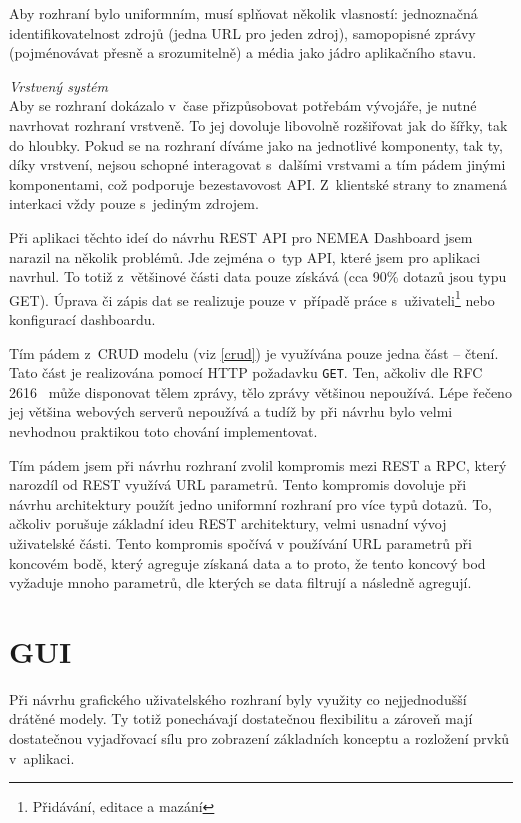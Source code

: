 \begin{description}
        Aby rozhraní bylo uniformním, musí splňovat několik vlasností: jednoznačná identifikovatelnost zdrojů (jedna URL pro jeden zdroj), samopopisné zprávy (pojménovávat přesně a srozumitelně) a média jako jádro aplikačního stavu.

    \item \textit{Vrstvený systém} \\
        Aby se rozhraní dokázalo v~čase přizpůsobovat potřebám vývojáře, je nutné navrhovat rozhraní vrstveně. To jej dovoluje libovolně rozšiřovat jak do šířky, tak do hloubky. Pokud se na rozhraní díváme jako na jednotlivé komponenty, tak ty, díky vrstvení, nejsou schopné interagovat s~dalšími vrstvami a tím pádem jinými komponentami, což podporuje bezestavovost API. Z~klientské strany to znamená interkaci vždy pouze s~jediným zdrojem.
        
\end{description}

Při aplikaci těchto ideí do návrhu REST API pro NEMEA Dashboard jsem narazil na několik problémů. Jde zejména o~typ API, které jsem pro aplikaci navrhul. To totiž z~většinové části data pouze získává (cca 90\% dotazů jsou typu GET). Úprava či zápis dat se realizuje pouze v~případě práce s~uživateli\footnote{Přidávání, editace a mazání } nebo konfigurací dashboardu.

Tím pádem z~CRUD modelu (viz \ref{crud}) je využívána pouze jedna část -- čtení. Tato část je realizována pomocí HTTP požadavku \texttt{GET}. Ten, ačkoliv dle RFC 2616~\cite{rfc:http} může disponovat tělem zprávy, tělo zprávy většinou nepoužívá. Lépe řečeno jej většina webových serverů nepoužívá a tudíž by při návrhu bylo velmi nevhodnou praktikou toto chování implementovat. 

Tím pádem jsem při návrhu rozhraní zvolil kompromis mezi REST a RPC, který narozdíl od REST využívá URL parametrů. Tento kompromis dovoluje při návrhu architektury použít jedno uniformní rozhraní pro více typů dotazů. To, ačkoliv porušuje základní ideu REST architektury, velmi usnadní vývoj uživatelské části. Tento kompromis spočívá v používání URL parametrů při koncovém bodě, který agreguje získaná data a to proto, že tento koncový bod vyžaduje mnoho parametrů, dle kterých se data filtrují a následně agregují.

\section{GUI}

Při návrhu grafického uživatelského rozhraní byly využity co nejjednodušší drátěné modely. Ty totiž ponechávají dostatečnou flexibilitu a zároveň mají dostatečnou vyjadřovací sílu pro zobrazení základních konceptu a rozložení prvků v~aplikaci.

